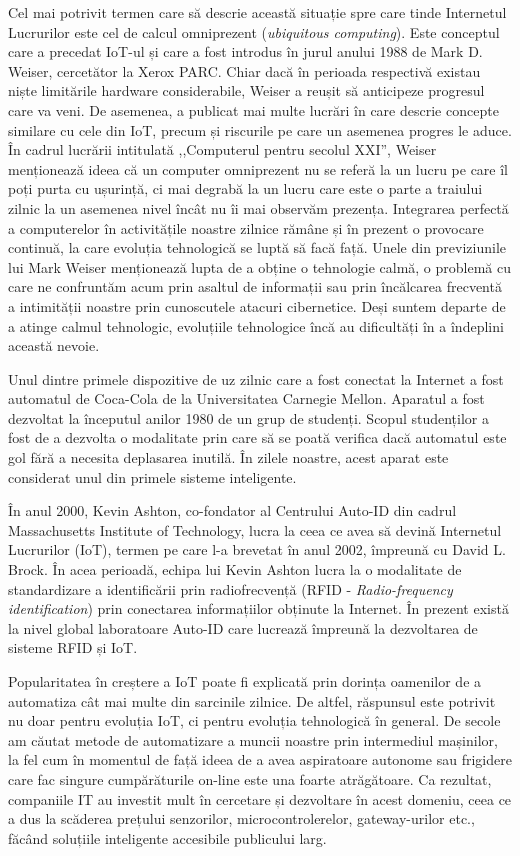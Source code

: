 Cel mai potrivit termen care să descrie această situație spre care tinde Internetul Lucrurilor este cel de calcul omniprezent (\textit{ubiquitous computing}).
 Este conceptul care a precedat IoT-ul și care a fost introdus în jurul anului 1988 de Mark D.
Weiser, cercetător la Xerox PARC.
Chiar dacă în perioada respectivă existau niște limitările hardware considerabile, Weiser a reușit să anticipeze progresul care va veni.
De asemenea, a publicat mai multe lucrări în care descrie concepte similare cu cele din IoT, precum și riscurile pe care un asemenea progres le aduce.
În cadrul lucrării intitulată ,,Computerul pentru secolul XXI'', Weiser menționează ideea că un computer omniprezent nu se referă la un lucru pe care îl poți purta cu ușurință, ci mai degrabă la un lucru care este o parte a traiului zilnic la un asemenea nivel încât nu îi mai observăm prezența.
Integrarea perfectă a computerelor în activitățile noastre zilnice rămâne și în prezent o provocare continuă, la care evoluția tehnologică se luptă să facă față.
Unele din previziunile lui Mark Weiser menționează lupta de a obține o tehnologie calmă, o problemă cu care ne confruntăm acum prin asaltul de informații sau prin încălcarea frecventă a intimității noastre prin cunoscutele atacuri cibernetice.
Deși suntem departe de a atinge calmul tehnologic, evoluțiile tehnologice încă au dificultăți în a îndeplini această nevoie.

Unul dintre primele dispozitive de uz zilnic care a fost conectat la Internet a fost automatul de Coca-Cola de la Universitatea Carnegie Mellon.
Aparatul a fost dezvoltat la începutul anilor 1980 de un grup de studenți.
Scopul studenților a fost de a dezvolta o modalitate prin care să se poată verifica dacă automatul este gol fără a necesita deplasarea inutilă.
În zilele noastre, acest aparat este considerat unul din primele sisteme inteligente.

În anul 2000, Kevin Ashton, co-fondator al Centrului Auto-ID din cadrul Massachusetts Institute of Technology, lucra la ceea ce avea să devină Internetul Lucrurilor (IoT), termen pe care l-a brevetat în anul 2002, împreună cu David L. Brock.
În acea perioadă, echipa lui Kevin Ashton lucra la o modalitate de standardizare a identificării prin radiofrecvență (RFID - \textit{Radio-frequency identification}) prin conectarea informațiilor obținute la Internet.
În prezent există la nivel global laboratoare Auto-ID care lucrează împreună la dezvoltarea de sisteme RFID și IoT.

Popularitatea în creștere a IoT poate fi explicată prin dorința oamenilor de a automatiza cât mai multe din sarcinile zilnice.
De altfel, răspunsul este potrivit nu doar pentru evoluția IoT, ci pentru evoluția tehnologică în general.
De secole am căutat metode de automatizare a muncii noastre prin intermediul mașinilor, la fel cum în momentul de față ideea de a avea aspiratoare autonome sau frigidere care fac singure cumpărăturile on-line este una foarte atrăgătoare.
Ca rezultat, companiile IT au investit mult în cercetare și dezvoltare în acest domeniu, ceea ce a dus la scăderea prețului senzorilor, microcontrolerelor, gateway-urilor etc., făcând soluțiile inteligente accesibile publicului larg.

